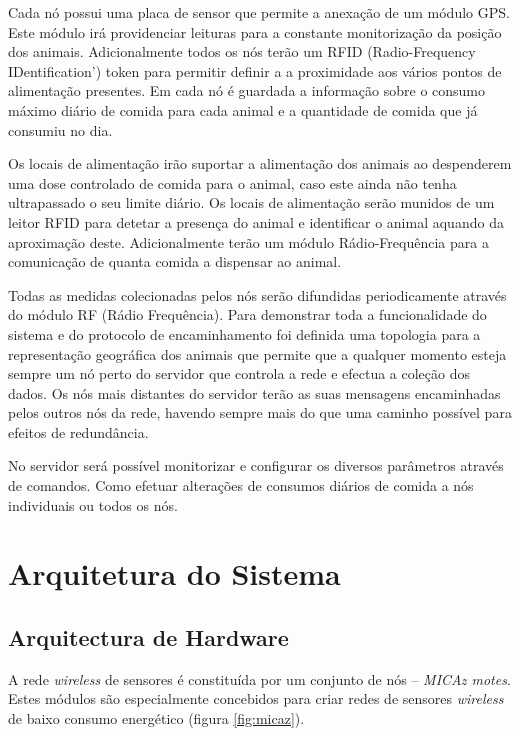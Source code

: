\documentclass[times,10pt,twocolumn]{article}
\begin{document}
Cada nó possui uma placa de sensor que permite a anexação de um módulo GPS. Este módulo irá providenciar leituras para a constante monitorização da posição dos animais. Adicionalmente todos os nós terão um RFID (Radio-Frequency IDentification') token para permitir definir a a proximidade aos vários pontos de alimentação presentes. Em cada nó é guardada a informação sobre o consumo máximo diário de comida para cada animal e a quantidade de comida que já consumiu no dia.

Os locais de alimentação irão suportar a alimentação dos animais ao despenderem uma dose controlado de comida para o animal, caso este ainda não tenha ultrapassado o seu limite diário. Os locais de alimentação serão munidos de um leitor RFID para detetar a presença do animal e identificar o animal aquando da aproximação deste. Adicionalmente terão um módulo Rádio-Frequência para a comunicação de quanta comida a dispensar ao animal.

Todas as medidas colecionadas pelos nós serão difundidas periodicamente através do módulo RF (Rádio Frequência). Para demonstrar toda a funcionalidade do sistema e do protocolo de encaminhamento foi definida uma topologia para a representação geográfica dos animais que permite que a qualquer momento esteja sempre um nó perto do servidor que controla a rede e efectua a coleção dos dados. Os nós mais distantes do servidor terão as suas mensagens encaminhadas pelos outros nós da rede, havendo sempre mais do que uma caminho possível para efeitos de redundância.

No servidor será possível monitorizar e configurar os diversos parâmetros através de comandos. Como efetuar alterações de consumos diários de comida a nós individuais ou todos os nós.

\section{Arquitetura do Sistema}


\subsection{Arquitectura de Hardware}

A rede \textit{wireless} de sensores é constituída por um conjunto de nós – \textit{MICAz motes}. Estes módulos são especialmente concebidos para criar redes de sensores \textit{wireless} de baixo consumo energético (figura \ref{fig:micaz}).
\end{document}
